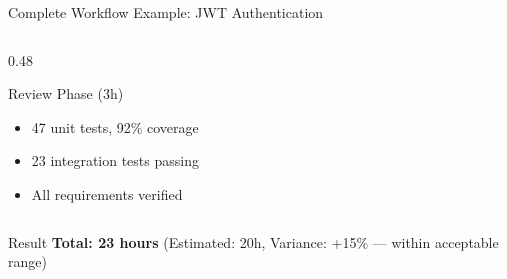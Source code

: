 \documentclass[aspectratio=169,10pt]{beamer}
\begin{document}
\begin{frame}{Complete Workflow Example: JWT Authentication}
\begin{columns}[T]
\begin{column}{0.48\textwidth}
\begin{exampleblock}{Review Phase (3h)}
                \begin{itemize}
                    \item 47 unit tests, 92\% coverage
                    \item 23 integration tests passing
                    \item All requirements verified
                \end{itemize}
            \end{exampleblock}
        \end{column}
    \end{columns}
    \vspace{0.2cm}
    \begin{block}{Result}
        \textbf{Total: 23 hours} (Estimated: 20h, Variance: +15\% --- within acceptable range)
    \end{block}

\end{frame}
\end{document}
